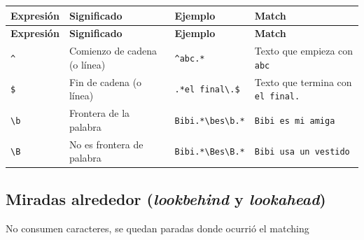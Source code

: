 \documentclass[a4paper, 8pt]{extarticle}
\begin{document}
\begin{longtable}{@{} p{2cm} p{7.5cm} p{3cm} p{5cm} @{}}
\toprule
\textbf{Expresión} & \textbf{Significado} & \textbf{Ejemplo} & \textbf{Match} \\
\midrule
\endfirsthead
\toprule
\textbf{Expresión} & \textbf{Significado} & \textbf{Ejemplo} & \textbf{Match} \\
\midrule
\endhead
\bottomrule
\endfoot
\bottomrule
\endlastfoot

\centering \verb!^!  & Comienzo de cadena (o línea) & \verb!^abc.*!         & Texto que empieza con \verb!abc!       \\
\centering \verb!$!  & Fin de cadena (o línea)      & \verb!.*el final\.$!  & Texto que termina con \verb!el final.! \\
\centering \verb!\b! & Frontera de la palabra       & \verb!Bibi.*\bes\b.*! & \verb!Bibi es mi amiga!                \\
\centering \verb!\B! & No es frontera de palabra    & \verb!Bibi.*\Bes\B.*! & \verb!Bibi usa un vestido!             \\
\end{longtable}


\subsection*{Miradas alrededor (\textit{lookbehind} y \textit{lookahead})}

No consumen caracteres, se quedan paradas donde ocurrió el matching
\end{document}
